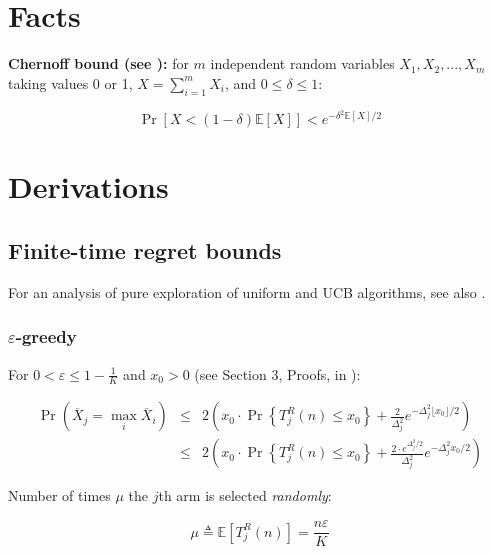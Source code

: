 \documentclass{article}
\newcommand {\IE} {\ensuremath {\mathbb{E}}}
\begin{document}



\pagebreak

\appendix

\section{Facts}

{\bf Chernoff bound (see \cite{Hagerup.chernoff}):} for $m$ independent random variables $X_1, X_2, ..., X_m$
taking values 0 or 1, $X=\sum_{i=1}^m X_i$, and $0\le\delta\le 1$:

\begin{equation}
\label{eq:chernoff-bound}
\Pr[X < (1-\delta)\IE[X]] < e^{-\delta^2\IE[X]/2}
\end{equation}

\section{Derivations}

\subsection{Finite-time regret bounds}

For an analysis of pure exploration of uniform and UCB algorithms, see also
\cite{Bubeck.pure}.


\subsubsection{$\varepsilon$-greedy}

For $0<\varepsilon\le1-\frac 1 K$ and $x_0>0$ (see Section 3, Proofs, in \cite{Auer.ucb}):

\begin{eqnarray}
\Pr(\overline X_j=\max_i\overline X_i)&\le&2\left(x_0\cdot \Pr\left\{T_j^R(n)\le x_0\right\} + \frac 2{\Delta_j^2}e^{-\Delta_j^2\lfloor x_0 \rfloor/2}\right)\nonumber\\
&\le&2\left(x_0\cdot \Pr\left\{T_j^R(n)\le x_0\right\} + \frac {2 \cdot
  e^{\Delta_j^2/2}}{\Delta_j^2}e^{-\Delta_j^2 x_0 /2}\right)
\end{eqnarray}

Number of times $\mu$ the $j$th arm is selected {\it randomly}:

\begin{equation}
\mu\triangleq\IE\left[T_j^R(n)\right]=\frac {n\varepsilon} K
\end{equation}
\end{document}
